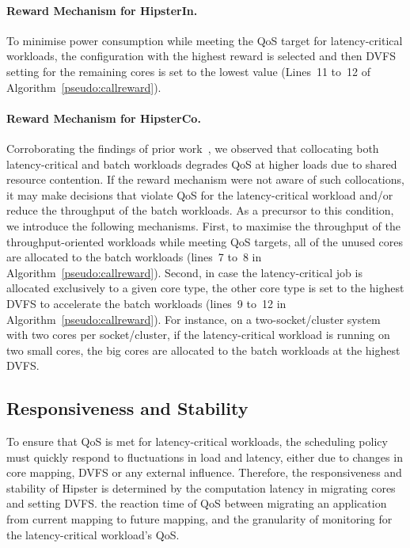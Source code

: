 
\paragraph*{Reward Mechanism for HipsterIn.} To minimise power consumption while meeting
the QoS target for latency-critical workloads, the configuration with the highest reward
is selected and then DVFS setting for the remaining cores is set to the lowest value
(Lines~11 to~12 of Algorithm~\ref{pseudo:callreward}).

\paragraph*{Reward Mechanism for HipsterCo.} Corroborating the findings of prior
work~\citep{Lo2015Heracles}, we observed that collocating both latency-critical and batch
workloads degrades QoS at higher loads due to shared resource contention. If the reward
mechanism were not aware of such collocations, it may make decisions that violate QoS for
the latency-critical workload and/or reduce the throughput of the batch workloads.  As a
precursor to this condition, we introduce the following mechanisms. First, to maximise the
throughput of the throughput-oriented workloads while meeting QoS targets, all of the
unused cores are allocated to the batch workloads (lines~7 to~8 in
Algorithm~\ref{pseudo:callreward}). Second, in case the latency-critical job is allocated
exclusively to a given core type, the other core type is set to the highest DVFS to
accelerate the batch workloads (lines~9 to~12 in Algorithm~\ref{pseudo:callreward}). For
instance, on a two-socket/cluster system with two cores per socket/cluster, if the
latency-critical workload is running on two small cores, the big cores are allocated to
the batch workloads at the highest DVFS. 

\subsection{Responsiveness and Stability}
\label{subsec: respstab}

 To ensure that QoS is met for latency-critical workloads, the scheduling policy must
quickly respond to fluctuations in load and latency, either due to changes in core
mapping, DVFS or any external influence. Therefore, the responsiveness and stability of
Hipster is determined by {\small {}} the computation latency in migrating cores and setting DVFS.
{\small {}} the reaction time of QoS between migrating an application from current mapping to
future mapping, and {\small {}} the granularity of monitoring for the latency-critical workload's
QoS. 

